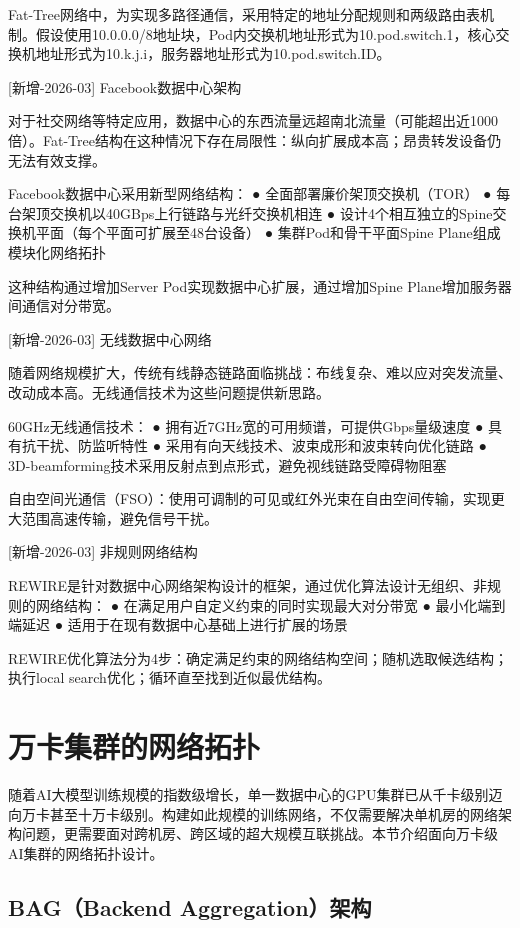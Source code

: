 Fat-Tree网络中，为实现多路径通信，采用特定的地址分配规则和两级路由表机制。假设使用10.0.0.0/8地址块，Pod内交换机地址形式为10.pod.switch.1，核心交换机地址形式为10.k.j.i，服务器地址形式为10.pod.switch.ID。

[新增-2026-03] Facebook数据中心架构

对于社交网络等特定应用，数据中心的东西流量远超南北流量（可能超出近1000倍）。Fat-Tree结构在这种情况下存在局限性：纵向扩展成本高；昂贵转发设备仍无法有效支撑。

Facebook数据中心采用新型网络结构：
 ● 全面部署廉价架顶交换机（TOR）
 ● 每台架顶交换机以40GBps上行链路与光纤交换机相连
 ● 设计4个相互独立的Spine交换机平面（每个平面可扩展至48台设备）
 ● 集群Pod和骨干平面Spine Plane组成模块化网络拓扑

这种结构通过增加Server Pod实现数据中心扩展，通过增加Spine Plane增加服务器间通信对分带宽。

[新增-2026-03] 无线数据中心网络

随着网络规模扩大，传统有线静态链路面临挑战：布线复杂、难以应对突发流量、改动成本高。无线通信技术为这些问题提供新思路。

60GHz无线通信技术：
 ● 拥有近7GHz宽的可用频谱，可提供Gbps量级速度
 ● 具有抗干扰、防监听特性
 ● 采用有向天线技术、波束成形和波束转向优化链路
 ● 3D-beamforming技术采用反射点到点形式，避免视线链路受障碍物阻塞

自由空间光通信（FSO）：使用可调制的可见或红外光束在自由空间传输，实现更大范围高速传输，避免信号干扰。

[新增-2026-03] 非规则网络结构

REWIRE是针对数据中心网络架构设计的框架，通过优化算法设计无组织、非规则的网络结构：
 ● 在满足用户自定义约束的同时实现最大对分带宽
 ● 最小化端到端延迟
 ● 适用于在现有数据中心基础上进行扩展的场景

REWIRE优化算法分为4步：确定满足约束的网络结构空间；随机选取候选结构；执行local search优化；循环直至找到近似最优结构。

\section{万卡集群的网络拓扑}

随着AI大模型训练规模的指数级增长，单一数据中心的GPU集群已从千卡级别迈向万卡甚至十万卡级别。构建如此规模的训练网络，不仅需要解决单机房的网络架构问题，更需要面对跨机房、跨区域的超大规模互联挑战。本节介绍面向万卡级AI集群的网络拓扑设计。

\subsection{BAG（Backend Aggregation）架构}

